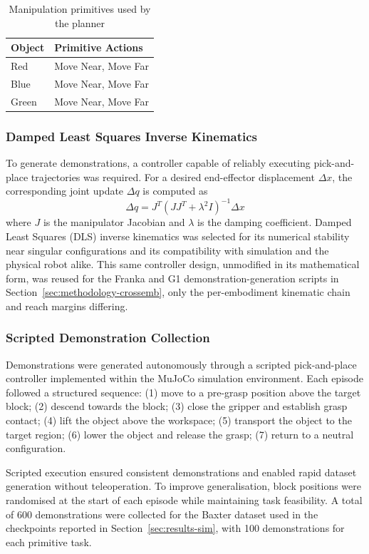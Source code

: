 \documentclass[12pt]{article}
\begin{document}
\begin{table}[H]
\centering
\caption{Manipulation primitives used by the planner}
\label{tab:primitives}
\begin{tabular}{ll}
\toprule
\textbf{Object} & \textbf{Primitive Actions} \\
\midrule
Red & Move Near, Move Far \\
Blue & Move Near, Move Far \\
Green & Move Near, Move Far \\
\bottomrule
\end{tabular}
\end{table}

\subsubsection{Damped Least Squares Inverse Kinematics}
To generate demonstrations, a controller capable of reliably executing pick-and-place trajectories was required. For a desired end-effector displacement $\Delta x$, the corresponding joint update $\Delta q$ is computed as
\begin{equation}
\Delta q = J^T (J J^T + \lambda^2 I)^{-1} \Delta x
\label{eq:dls}
\end{equation}
where $J$ is the manipulator Jacobian and $\lambda$ is the damping coefficient. Damped Least Squares (DLS) inverse kinematics was selected for its numerical stability near singular configurations and its compatibility with simulation and the physical robot alike. This same controller design, unmodified in its mathematical form, was reused for the Franka and G1 demonstration-generation scripts in Section~\ref{sec:methodology-crossemb}, only the per-embodiment kinematic chain and reach margins differing.

\subsubsection{Scripted Demonstration Collection}
Demonstrations were generated autonomously through a scripted pick-and-place controller implemented within the MuJoCo simulation environment. Each episode followed a structured sequence: (1) move to a pre-grasp position above the target block; (2) descend towards the block; (3) close the gripper and establish grasp contact; (4) lift the object above the workspace; (5) transport the object to the target region; (6) lower the object and release the grasp; (7) return to a neutral configuration.

Scripted execution ensured consistent demonstrations and enabled rapid dataset generation without teleoperation. To improve generalisation, block positions were randomised at the start of each episode while maintaining task feasibility. A total of 600 demonstrations were collected for the Baxter dataset used in the checkpoints reported in Section~\ref{sec:results-sim}, with 100 demonstrations for each primitive task.
\end{document}
